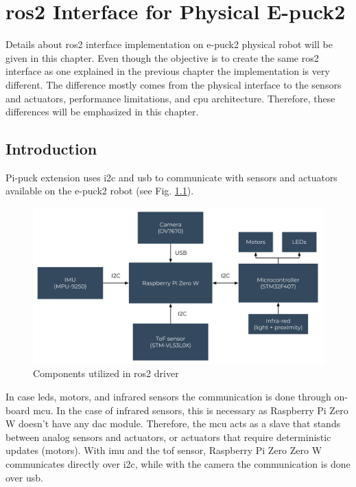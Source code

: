 \chapter{\acs{ros2} Interface for Physical E-puck2}
\label{chap:physical}

Details about \ac{ros2} interface implementation on e-puck2 physical robot will be given in this chapter.
Even though the objective is to create the same \ac{ros2} interface as one explained in the previous chapter the implementation is very different.
The difference mostly comes from the physical interface to the sensors and actuators, performance limitations, and \ac{cpu} architecture.
Therefore, these differences will be emphasized in this chapter.

\section{Introduction}

Pi-puck extension uses \ac{i2c} and \ac{usb} to communicate with sensors and actuators available on the e-puck2 robot (see Fig. \ref{fig:physical:general}).

\begin{figure}[H]
    \centering
    \includegraphics[width=\textwidth]{physical/figures/general.pdf}
    \caption{Components utilized in \ac{ros2} driver}
    \label{fig:physical:general}
\end{figure}

In case \acp{led}, motors, and infrared sensors the communication is done through on-board \ac{mcu}.
In the case of infrared sensors, this is necessary as Raspberry Pi Zero W doesn't have any \ac{dac} module. 
Therefore, the \ac{mcu} acts as a slave that stands between analog sensors and actuators, or actuators that require deterministic updates (motors).
With \ac{imu} and the \ac{tof} sensor, Raspberry Pi Zero Zero W communicates directly over \ac{i2c}, while with the camera the communication is done over \ac{usb}. 

